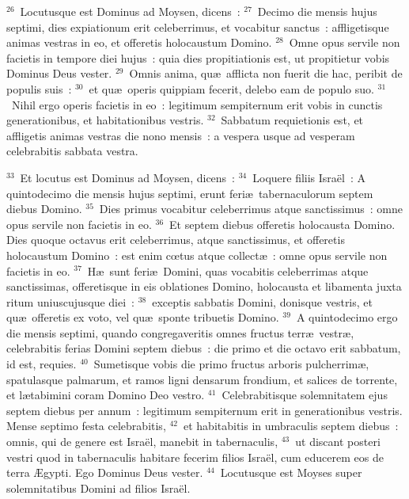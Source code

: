 ${}^{26}$~Locutusque est Dominus ad Moysen, dicens~:
${}^{27}$~Decimo die mensis hujus septimi, dies expiationum erit celeberrimus, et vocabitur sanctus~: affligetisque animas vestras in eo, et offeretis holocaustum Domino.
${}^{28}$~Omne opus servile non facietis in tempore diei hujus~: quia dies propitiationis est, ut propitietur vobis Dominus Deus vester.
${}^{29}$~Omnis anima, qu\ae\ afflicta non fuerit die hac, peribit de populis suis~:
${}^{30}$~et qu\ae\ operis quippiam fecerit, delebo eam de populo suo.
${}^{31}$~Nihil ergo operis facietis in eo~: legitimum sempiternum erit vobis in cunctis generationibus, et habitationibus vestris.
${}^{32}$~Sabbatum requietionis est, et affligetis animas vestras die nono mensis~: a vespera usque ad vesperam celebrabitis sabbata vestra.


${}^{33}$~Et locutus est Dominus ad Moysen, dicens~:
${}^{34}$~Loquere filiis Isra\"el~: A quintodecimo die mensis hujus septimi, erunt feri\ae\ tabernaculorum septem diebus Domino.
${}^{35}$~Dies primus vocabitur celeberrimus atque sanctissimus~: omne opus servile non facietis in eo.
${}^{36}$~Et septem diebus offeretis holocausta Domino. Dies quoque octavus erit celeberrimus, atque sanctissimus, et offeretis holocaustum Domino~: est enim cœtus atque collect\ae~: omne opus servile non facietis in eo.
${}^{37}$~H\ae\ sunt feri\ae\ Domini, quas vocabitis celeberrimas atque sanctissimas, offeretisque in eis oblationes Domino, holocausta et libamenta juxta ritum uniuscujusque diei~:
${}^{38}$~exceptis sabbatis Domini, donisque vestris, et qu\ae\ offeretis ex voto, vel qu\ae\ sponte tribuetis Domino.
${}^{39}$~A quintodecimo ergo die mensis septimi, quando congregaveritis omnes fructus terr\ae\ vestr\ae , celebrabitis ferias Domini septem diebus~: die primo et die octavo erit sabbatum, id est, requies.
${}^{40}$~Sumetisque vobis die primo fructus arboris pulcherrim\ae , spatulasque palmarum, et ramos ligni densarum frondium, et salices de torrente, et l\ae tabimini coram Domino Deo vestro.
${}^{41}$~Celebrabitisque solemnitatem ejus septem diebus per annum~: legitimum sempiternum erit in generationibus vestris. Mense septimo festa celebrabitis,
${}^{42}$~et habitabitis in umbraculis septem diebus~: omnis, qui de genere est Isra\"el, manebit in tabernaculis,
${}^{43}$~ut discant posteri vestri quod in tabernaculis habitare fecerim filios Isra\"el, cum educerem eos de terra \AE gypti. Ego Dominus Deus vester.
${}^{44}$~Locutusque est Moyses super solemnitatibus Domini ad filios Isra\"el.

